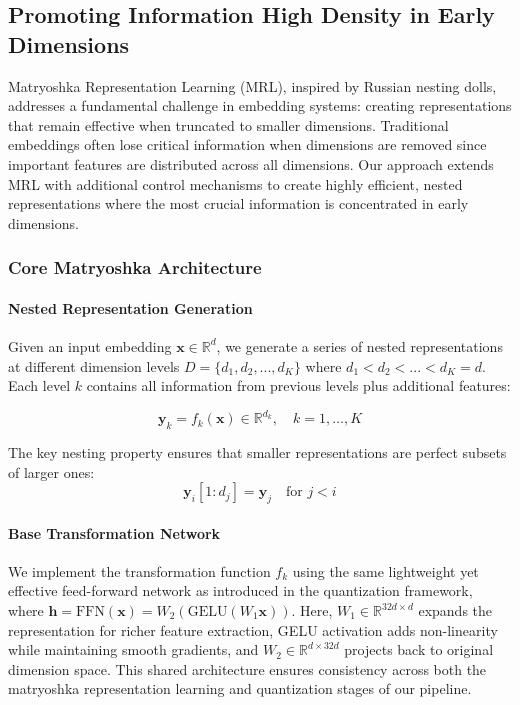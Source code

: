 \subsection{Promoting Information High Density in Early Dimensions}
\label{subsec:matryoshka_and_control}
Matryoshka Representation Learning (MRL), inspired by Russian nesting dolls, addresses a fundamental challenge in embedding systems: creating representations that remain effective when truncated to smaller dimensions. Traditional embeddings often lose critical information when dimensions are removed since important features are distributed across all dimensions. Our approach extends MRL with additional control mechanisms to create highly efficient, nested representations where the most crucial information is concentrated in early dimensions.

\subsubsection{Core Matryoshka Architecture}

\paragraph{Nested Representation Generation}
Given an input embedding $\mathbf{x} \in \mathbb{R}^d$, we generate a series of nested representations at different dimension levels $D = \{d_1, d_2, ..., d_K\}$ where $d_1 < d_2 < ... < d_K = d$. Each level $k$ contains all information from previous levels plus additional features:

\begin{equation}
    \mathbf{y}_k = f_k(\mathbf{x}) \in \mathbb{R}^{d_k}, \quad k = 1,\ldots,K
\end{equation}

The key nesting property ensures that smaller representations are perfect subsets of larger ones:
\begin{equation}
    \mathbf{y}_i[1:d_j] = \mathbf{y}_j \quad \text{for } j < i
\end{equation}

\paragraph{Base Transformation Network}
We implement the transformation function $f_k$ using the same lightweight yet effective feed-forward network as introduced in the quantization framework, where $\mathbf{h} = \text{FFN}(\mathbf{x}) = W_2(\text{GELU}(W_1\mathbf{x}))$. Here, $W_1 \in \mathbb{R}^{32d \times d}$ expands the representation for richer feature extraction, GELU activation adds non-linearity while maintaining smooth gradients, and $W_2 \in \mathbb{R}^{d \times 32d}$ projects back to original dimension space. This shared architecture ensures consistency across both the matryoshka representation learning and quantization stages of our pipeline.

